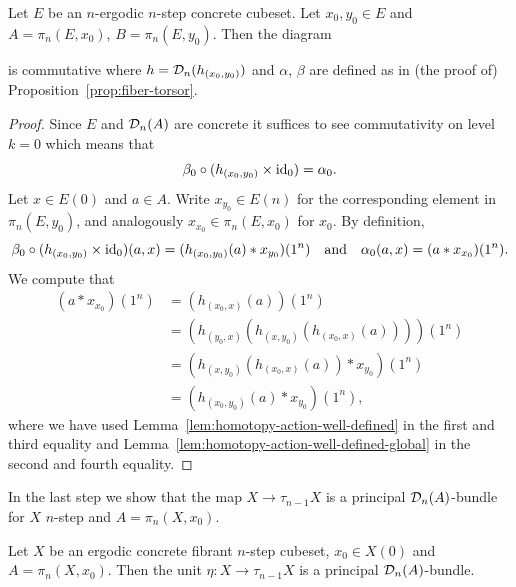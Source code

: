 \begin{lemma}\label{lem:action-independence-basepoint}
Let $E$ be an $n$-ergodic $n$-step concrete cubeset.
Let $x_0,y_0\in E$ and $A = \pi_n(E,x_0)$, $B = \pi_n(E,y_0)$.
Then the diagram
\begin{center}
\end{center}
is commutative where $h = \mathcal{D}_n(h_{(x_0,y_0)})$
and $\alpha$, $\beta$ are defined as in (the proof of) Proposition~\ref{prop:fiber-torsor}.
\end{lemma}

\begin{proof}
Since $E$ and $\mathcal{D}_n(A)$ are concrete it suffices to see commutativity on level $k=0$
which means that
\[
    \beta_0\circ(h_{(x_0,y_0)}\times\operatorname{id}_0) = \alpha_0.
\]
Let $x\in E(0)$ and $a\in A$.
Write $x_{y_0}\in E(n)$ for the corresponding element in $\pi_n(E,y_0)$,
and analogously $x_{x_0}\in\pi_n(E,x_0)$ for $x_0$.
By definition,
\[
    \beta_0\circ(h_{(x_0,y_0)}\times\operatorname{id}_0)(a,x) = (h_{(x_0,y_0)}(a)*x_{y_0})(1^n)
    \quad\text{and}\quad
    \alpha_0(a,x) = (a*x_{x_0})(1^n).
\]
We compute that
\begin{align*}
       (a*x_{x_0})(1^n)
    &= (h_{(x_0,x)}(a))(1^n) \\
    &= (h_{(y_0,x)}(h_{(x,y_0)}(h_{(x_0,x)}(a))))(1^n) \\
    &= (h_{(x,y_0)}(h_{(x_0,x)}(a))*x_{y_0})(1^n) \\
    &= (h_{(x_0,y_0)}(a)*x_{y_0})(1^n),
\end{align*}
where we have used Lemma~\ref{lem:homotopy-action-well-defined}
in the first and third equality and Lemma~\ref{lem:homotopy-action-well-defined-global}
in the second and fourth equality.
\end{proof}

In the last step we show that the map $X\to\tau_{n-1}X$ is a principal $\mathcal{D}_n(A)$-bundle
for $X$ $n$-step and $A = \pi_n(X,x_0)$.

\begin{proposition}\label{prop:unit-principal-bundle}
Let $X$ be an ergodic concrete fibrant $n$-step cubeset, $x_0\in X(0)$ and $A = \pi_n(X,x_0)$.
Then the unit $\eta\colon X\to\tau_{n-1}X$ is a principal $\mathcal{D}_n(A)$-bundle.
\end{proposition}

